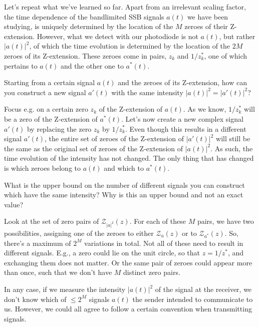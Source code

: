 Let's repeat what we've learned so far. Apart from an irrelevant scaling factor, the time dependence of the bandlimited SSB signals $a(t)$ we have been studying, is uniquely determined by the location of the $M$ zeroes of their Z-extension. However, what we detect with our photodiode is not $a(t)$, but rather $|a(t)|^2$, of which the time evolution is determined by the location of the $2M$ zeroes of its Z-extension. These zeroes come in pairs, $z_k$ and $1/z_k^*$, one of which pertains to $a(t)$ and the other one to $a^*(t)$.

\begin{cue}
Starting from a certain signal $a(t)$ and the zeroes of its Z-extension, how can you construct a new signal $a'(t)$ with the same intensity $|a(t)|^2=|a'(t)|^2$?   
\end{cue}

Focus e.g. on a certain zero $z_k$ of the Z-extension of $a(t)$. As we know, $1/z_k^*$ will be a zero of the Z-extension of $a^*(t)$. Let's now create a new complex signal $a'(t)$ by replacing the zero $z_k$ by $1/z_k^*$. Even though this results in a different signal $a'(t)$, the entire set of zeroes of the Z-extension of $|a'(t)|^2$ will still be the same as the original set of zeroes of the Z-extension of $|a(t)|^2$. As such, the time evolution of the intensity has not changed. The only thing that has changed is which zeroes belong to $a(t)$ and which to $a^*(t)$.

\begin{cue}
What is the upper bound on the number of different signals you can construct which have the same intensity? Why is this an upper bound and not an exact value?   
\end{cue}

Look at the set of zero pairs of $\mathcal{Z}_{|a|^2}(z)$. For each of these $M$ pairs, we have two possibilities, assigning one of the zeroes to either $\mathcal{Z}_{a}(z)$ or to $\mathcal{Z}_{a^*}(z)$. So, there's a maximum of $2^M$ variations in total. Not all of these need to result in different signals. E.g., a zero could lie on the unit circle, so that $z=1/z^*$, and exchanging them does not matter. Or the same pair of zeroes could appear more than once, such that we don't have $M$ distinct zero pairs.

In any case, if we measure the intensity $|a(t)|^2$ of the signal at the receiver, we don't know which of $\le2^M$ signals $a(t)$ the sender intended to communicate to us. However, we could all agree to follow a certain convention when transmitting signals. 

